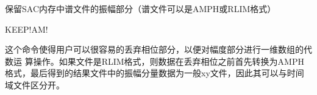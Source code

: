 \label{cmd:keepam}

保留SAC内存中谱文件的振幅部分（谱文件可以是AMPH或RLIM格式）

\begin{SACSTX}
KEEP!AM!
\end{SACSTX}

这个命令使得用户可以很容易的丢弃相位部分，以便对幅度部分进行一维数组的代数运	算操作。如果文件是RLIM格式，则数据在丢弃相位之前首先转换为AMPH格式，最后得到的结果文件中的振幅分量数据为一般xy文件，因此其可以与时间域文件区分开。
